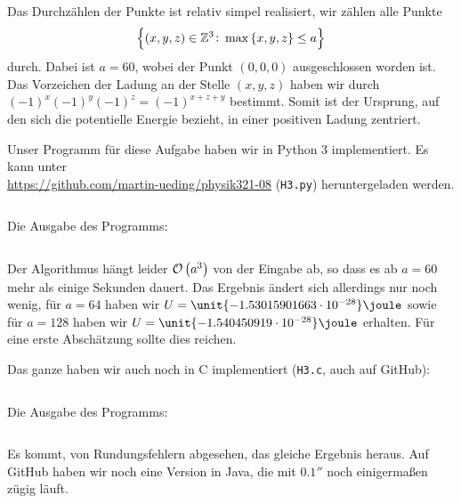 Das Durchzählen der Punkte ist relativ simpel realisiert, wir zählen alle
Punkte \[ \set{(x, y, z)\in \mathbb Z^3 \colon \max\set{x, y, z} \leq a} \]
durch. Dabei ist $a = 60$, wobei der Punkt $(0, 0, 0)$ ausgeschlossen worden
ist. Das Vorzeichen der Ladung an der Stelle $(x, y, z)$ haben wir durch
$(-1)^x (-1)^y (-1)^z = (-1)^{x+z+y}$ bestimmt. Somit ist der Ursprung, auf den
sich die potentielle Energie bezieht, in einer positiven Ladung zentriert.

Unser Programm für diese Aufgabe haben wir in Python 3 implementiert. Es kann
unter \\ \url{https://github.com/martin-ueding/physik321-08} (\texttt{H3.py})
heruntergeladen werden.

\inputminted[fontsize=\small, frame=lines, linenos]{python}{H3.py}

Die Ausgabe des Programms:

\inputminted[fontsize=\small, frame=lines]{text}{H3.py.txt}

Der Algorithmus hängt leider $\mathcal O\del{a^3}$ von der Eingabe ab, so dass
es ab $a = 60$ mehr als einige Sekunden dauert. Das Ergebnis ändert sich
allerdings nur noch wenig, für $a = 64$ haben wir $U =
\unit{-1.53015901663\e{-28}}\joule$ sowie für $a = 128$ haben wir $U =
\unit{-1.540450919\e{-28}}\joule$ erhalten. Für eine erste Abschätzung sollte
dies reichen.

Das ganze haben wir auch noch in C implementiert (\texttt{H3.c}, auch auf
GitHub):

\inputminted[fontsize=\small, frame=lines, linenos, tabsize=4]{c}{H3.c}

Die Ausgabe des Programms:

\inputminted[fontsize=\small, frame=lines]{text}{H3.c.txt}

Es kommt, von Rundungsfehlern abgesehen, das gleiche Ergebnis heraus. Auf
GitHub haben wir noch eine Version in Java, die mit $\unit{0.1}\second$ noch
einigermaßen zügig läuft.

%
%



